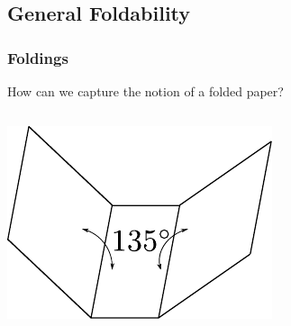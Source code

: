 \documentclass{beamer}
\begin{document}

\subsection{General Foldability}

\begin{frame}
\frametitle{Foldings}

\begin{block}{}
How can we capture the notion of a folded paper? 
\end{block}

\pause
\begin{columns}[c]

\pause
{}
\includegraphics[width=\textwidth]{knot_pix/folded-valid.pdf}
\end{columns}
\end{frame}
\end{document}
